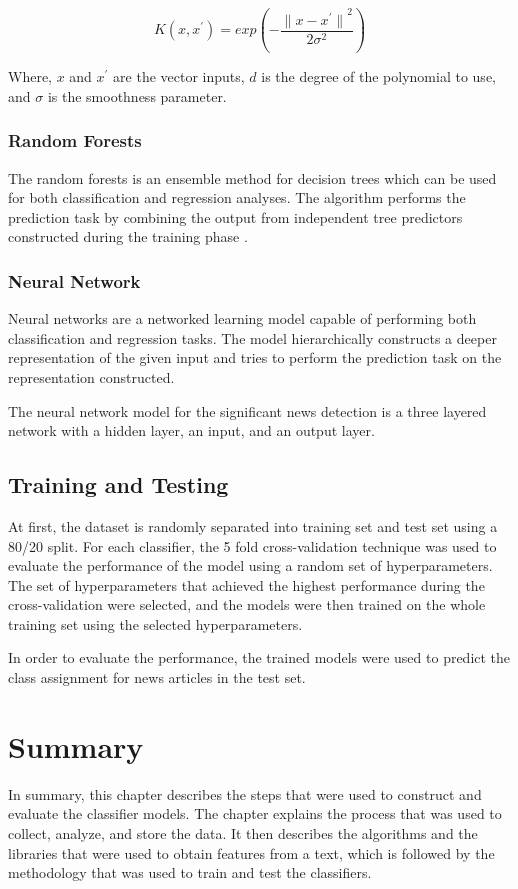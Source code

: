 \begin{equation}
    \label{eq:rbf_kernel}
    K(x, x^{'}) = exp(- \frac{{\lVert x - x^{'} \rVert}^{2}}{2 \sigma^{2}})
\end{equation}

\noindent
Where, $x$ and $x^{'}$ are the vector inputs, $d$ is the degree of the polynomial to use, and $\sigma$ is the smoothness parameter.

\subsubsection{Random Forests}
The random forests\cite{breiman2001random} is an ensemble method for decision trees\cite{quinlan1986induction} which can be used for both classification and regression analyses. The algorithm performs the prediction task by combining the output from independent tree predictors constructed during the training phase \cite{breiman2001random}. 

\subsubsection{Neural Network}
Neural networks are a networked learning model capable of performing both classification and regression tasks. The model hierarchically constructs a deeper representation of the given input and tries to perform the prediction task on the representation constructed. 

The neural network model for the significant news detection is a three layered network with a hidden layer, an input, and an output layer.

\subsection{Training and Testing}
At first, the dataset is randomly separated into training set and test set using a 80/20 split. For each classifier, the 5 fold cross-validation technique was used to evaluate the performance of the model using a random set of hyperparameters. The set of hyperparameters that achieved the highest performance during the cross-validation were selected, and the models were then trained on the whole training set using the selected hyperparameters.

In order to evaluate the performance, the trained models were used to predict the class assignment for news articles in the test set. 

\section{Summary}
In summary, this chapter describes the steps that were used to construct and evaluate the classifier models. The chapter explains the process that was used to collect, analyze, and store the data. It then describes the algorithms and the libraries that were used to obtain features from a text, which is followed by the methodology that was used to train and test the classifiers.
